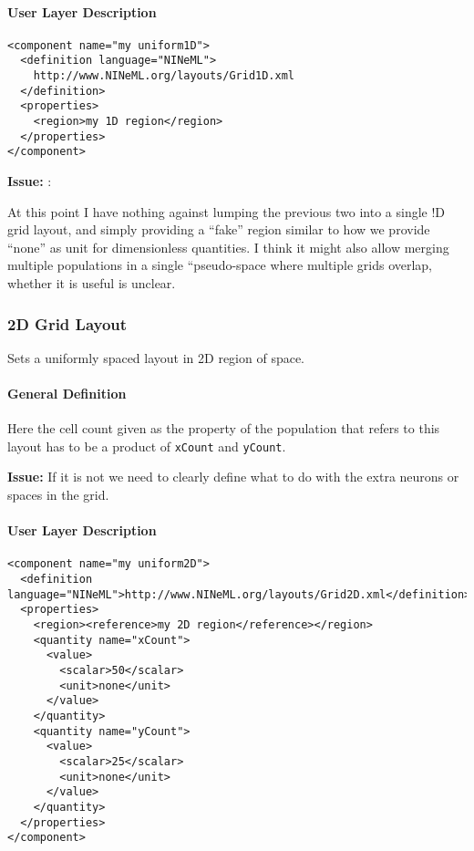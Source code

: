 \documentclass{article}
\newcommand{\issue}[1]{%
\begin{center}
\colorbox{issuecolor}{\parbox{0.8\linewidth}{\textbf{Issue:} #1}}
\end{center}%
}
\begin{document}
\paragraph{User Layer Description}
\begin{verbatim}
<component name="my uniform1D">
  <definition language="NINeML">
    http://www.NINeML.org/layouts/Grid1D.xml
  </definition>
  <properties>
    <region>my 1D region</region>
  </properties>
</component>
\end{verbatim}

\issue:{At this point I have nothing against lumping the previous two into a single !D
grid layout, and simply providing a ``fake'' region similar to how we provide ``none''
as unit for dimensionless quantities. I think it might also allow merging multiple
populations in a single ``pseudo-space where multiple grids overlap, whether it
is useful is unclear.}

\subsubsection{2D Grid Layout}

Sets a uniformly spaced layout in 2D region of space.

\paragraph{General Definition}
Here the cell count given as the property of the population that refers to this layout
has to be a product of {\tt xCount} and {\tt yCount}.

\issue{If it is not we need to clearly define what to do with the extra neurons or spaces
in the grid.}

\paragraph{User Layer Description}
\begin{verbatim}
<component name="my uniform2D">
  <definition language="NINeML">http://www.NINeML.org/layouts/Grid2D.xml</definition>
  <properties>
    <region><reference>my 2D region</reference></region>
    <quantity name="xCount">
      <value>
        <scalar>50</scalar>
        <unit>none</unit>
      </value>
    </quantity>
    <quantity name="yCount">
      <value>
        <scalar>25</scalar>
        <unit>none</unit>
      </value>
    </quantity>
  </properties>
</component>
\end{verbatim}
\end{document}
